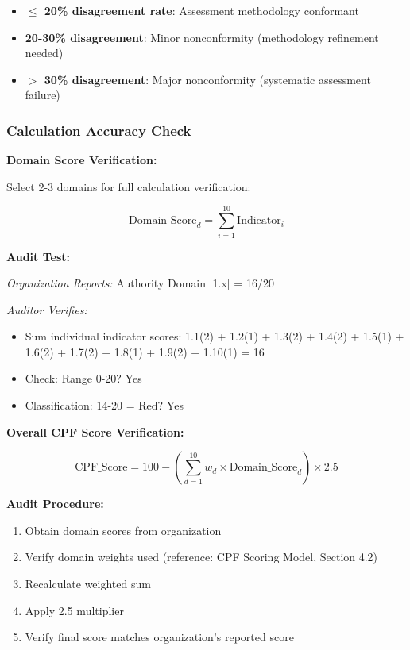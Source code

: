 \documentclass[11pt,a4paper]{article}
\begin{document}
\begin{itemize}
\item \textbf{$\leq$ 20\% disagreement rate}: Assessment methodology conformant
\item \textbf{20-30\% disagreement}: Minor nonconformity (methodology refinement needed)
\item \textbf{$>$ 30\% disagreement}: Major nonconformity (systematic assessment failure)
\end{itemize}

\subsubsection{Calculation Accuracy Check}

\textbf{Domain Score Verification:}

Select 2-3 domains for full calculation verification:

\begin{equation}
\text{Domain\_Score}_d = \sum_{i=1}^{10} \text{Indicator}_i
\end{equation}

\textbf{Audit Test:}

\textit{Organization Reports:} Authority Domain [1.x] = 16/20

\textit{Auditor Verifies:}
\begin{itemize}
\item Sum individual indicator scores: 1.1(2) + 1.2(1) + 1.3(2) + 1.4(2) + 1.5(1) + 1.6(2) + 1.7(2) + 1.8(1) + 1.9(2) + 1.10(1) = 16 \checkmark
\item Check: Range 0-20? Yes \checkmark
\item Classification: 14-20 = Red? Yes \checkmark
\end{itemize}

\textbf{Overall CPF Score Verification:}

\begin{equation}
\text{CPF\_Score} = 100 - \left( \sum_{d=1}^{10} w_d \times \text{Domain\_Score}_d \right) \times 2.5
\end{equation}

\textbf{Audit Procedure:}

\begin{enumerate}
\item Obtain domain scores from organization
\item Verify domain weights used (reference: CPF Scoring Model, Section 4.2)
\item Recalculate weighted sum
\item Apply 2.5 multiplier
\item Verify final score matches organization's reported score
\end{enumerate}
\end{document}
